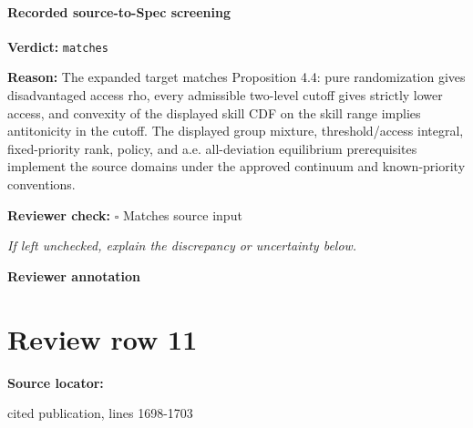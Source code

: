 \documentclass[10pt]{article}
\newcommand{\reviewerbox}{%
  \par\noindent\fbox{\parbox{0.96\linewidth}{\rule{0pt}{0.38in}}}\par
}
\newcommand{\reviewmatch}[1]{%
  \par\noindent\textbf{Reviewer check:} $\square$\; #1\par
  \noindent\emph{If left unchecked, explain the discrepancy or uncertainty below.}\par
}
\begin{document}
\paragraph{Recorded source-to-Spec screening}
\textbf{Verdict:} \texttt{matches}
\\
{\raggedright
\textbf{Reason:} The expanded target matches Proposition 4.\allowbreak{}4:\allowbreak{} pure randomization gives disadvantaged access rho, every admissible two-\allowbreak{}level cutoff gives strictly lower access, and convexity of the displayed skill CDF on the skill range implies antitonicity in the cutoff.\allowbreak{} The displayed group mixture, threshold/\allowbreak{}access integral, fixed-\allowbreak{}priority rank, policy, and a.\allowbreak{}e.\allowbreak{} all-\allowbreak{}deviation equilibrium prerequisites implement the source domains under the approved continuum and known-\allowbreak{}priority conventions.\allowbreak{}
\par}
\reviewmatch{Matches source input}
\noindent\textbf{Reviewer annotation}\par
\reviewerbox
\clearpage
\hypertarget{source-claim-6cc5784dc863c5dc}{}
\section*{Review row 11}
\textbf{Source locator:} {\footnotesize\raggedright cited publication, lines 1698-\allowbreak{}1703\par}
\end{document}
